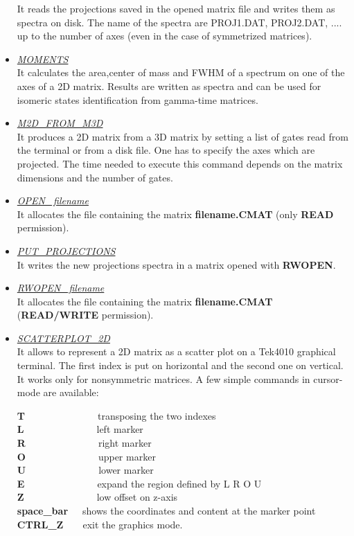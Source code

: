 \begin{itemize}
	It reads the projections saved in the opened matrix file and writes
	them as spectra on disk. The name of the spectra are PROJ1.DAT,
	PROJ2.DAT, .... up to the number of axes (even in the case of
	symmetrized matrices).
	
 \item	{\it\underline{MOMENTS}} \\

	It calculates the area,center of mass and FWHM of a spectrum on one of
	the axes of a 2D matrix. Results are written as spectra and can be used
	for isomeric states identification from gamma-time matrices.

 \item	{\it\underline{M2D\_FROM\_M3D}} \\

	It produces a 2D matrix from a 3D matrix by setting a list of gates
	read from the terminal or from a disk file. One has to specify the axes
	which are projected. The time needed to execute this command depends on
	the matrix dimensions and the number of gates.

 \item	{\it\underline{OPEN ~filename}} \\

	It allocates the file containing the matrix {\bf filename.CMAT} (only
	{\bf READ} permission).

 \item	{\it\underline{PUT\_PROJECTIONS}} \\

	It writes the new projections spectra in a matrix opened with {\bf
	RWOPEN}.
		  
 \item	{\it\underline{RWOPEN ~filename}} \\

	It allocates the file containing the matrix {\bf filename.CMAT} 
	({\bf READ/WRITE} permission).


 \item	{\it\underline{SCATTERPLOT\_2D}} \\

	It allows to represent a 2D matrix as a scatter plot on a Tek4010
	graphical terminal. The first index is put on horizontal and the second
	one on vertical. It works only for nonsymmetric matrices. A few simple 
	commands in cursor-mode are available:

	{\bf T}~~~~~~~~~~~~~~~transposing the two indexes\\
	{\bf L}~~~~~~~~~~~~~~~left marker\\
	{\bf R}~~~~~~~~~~~~~~~right marker\\
	{\bf O}~~~~~~~~~~~~~~~upper marker\\
	{\bf U}~~~~~~~~~~~~~~~lower marker\\
	{\bf E}~~~~~~~~~~~~~~~expand the region defined by L R O U\\
	{\bf Z}~~~~~~~~~~~~~~~low offset on z-axis\\
	{\bf space\_bar}~~~shows the coordinates and content at the marker
				point\\
	{\bf CTRL\_Z}~~~~exit the graphics mode.\\


\end{itemize}
